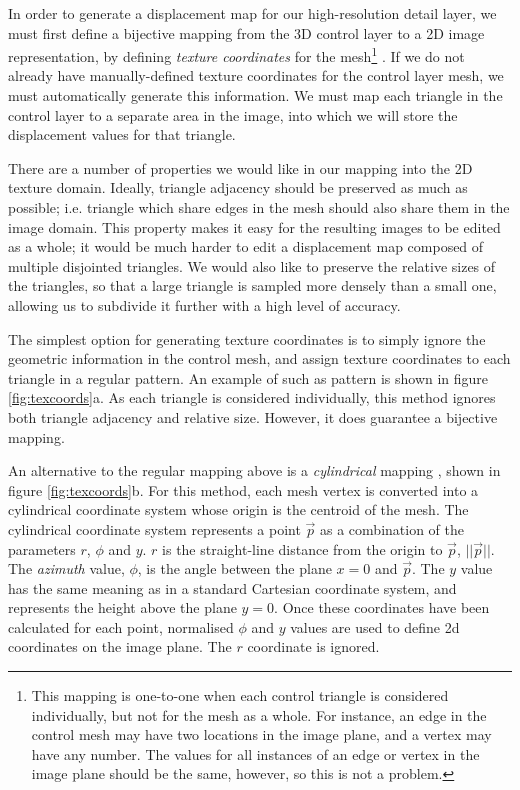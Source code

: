 In order to generate a displacement map for our high-resolution detail layer, we must first define a bijective mapping from the 3D control layer to a 2D image representation, by defining {\it texture coordinates} for the mesh\footnote{This mapping is one-to-one when each control triangle is considered individually, but not for the mesh as a whole. For instance, an edge in the control mesh may have two locations in the image plane, and a vertex may have any number. The values for all instances of an edge or vertex in the image plane should be the same, however, so this is not a problem.} . If we do not already have manually-defined texture coordinates for the control layer mesh, we must automatically generate this information. We must map each triangle in the control layer to a separate area in the image, into which we will store the displacement values for that triangle.

There are a number of properties we would like in our mapping into the 2D texture domain. Ideally, triangle adjacency should be preserved as much as possible; i.e. triangle which share edges in the mesh should also share them in the image domain. This property makes it easy for the resulting images to be edited as a whole; it would be much harder to edit a displacement map composed of multiple disjointed triangles. We would also like to preserve the relative sizes of the triangles, so that a large triangle is sampled more densely than a small one, allowing us to subdivide it further with a high level of accuracy.

The simplest option for generating texture coordinates is to simply ignore the geometric information in the control mesh, and assign texture coordinates to each triangle in a regular pattern. An example of such as pattern is shown in figure \ref{fig:texcoords}a. As each triangle is considered individually, this method ignores both triangle adjacency and relative size. However, it does guarantee a bijective mapping.

An alternative to the regular mapping above is a {\it cylindrical} mapping \cite{Lengyel02}, shown in figure \ref{fig:texcoords}b. For this method, each mesh vertex is converted into a cylindrical coordinate system whose origin is the centroid of the mesh. The cylindrical coordinate system represents a point $\vec{p}$ as a combination of the parameters $r$, $\phi$ and $y$. $r$ is the straight-line distance from the origin to $\vec{p}$, $||\vec{p}||$. The {\it azimuth} value, $\phi$, is the angle between the plane $x=0$ and $\vec{p}$. The $y$ value has the same meaning as in a standard Cartesian coordinate system, and represents the height above the plane $y=0$. Once these coordinates have been calculated for each point, normalised $\phi$ and $y$ values are used to define 2d coordinates on the image plane. The $r$ coordinate is ignored.

